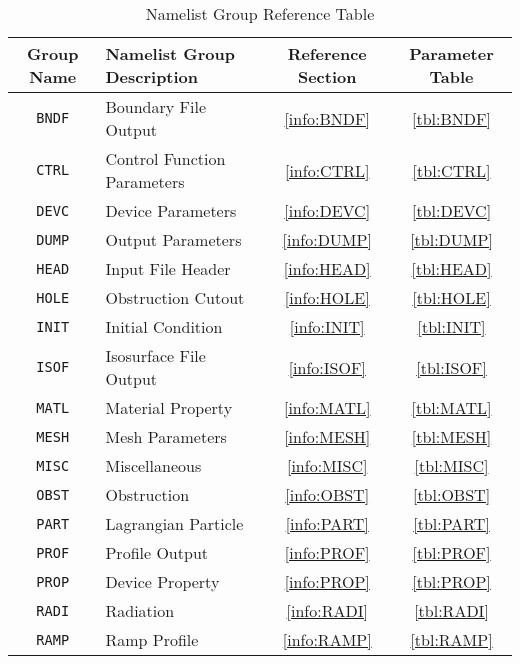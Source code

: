 \documentclass[11pt]{book}
\newcommand{\ct}{\tt\small}
\begin{document}
\vspace{\baselineskip}
\begin{table}[ht]
\begin{center}
\caption{Namelist Group Reference Table}
\label{tbl:namelistgroups}
\begin{tabular}{|c|l|c|c|}
\hline
Group Name  & Namelist Group Description& Reference Section & Parameter Table  \\ \hline
{\ct BNDF}  & Boundary File Output         & \ref{info:BNDF} & \ref{tbl:BNDF}  \\ \hline
{\ct CTRL}  & Control Function Parameters  & \ref{info:CTRL} & \ref{tbl:CTRL}  \\ \hline
{\ct DEVC}  & Device Parameters            & \ref{info:DEVC} & \ref{tbl:DEVC}  \\ \hline
{\ct DUMP}  & Output Parameters            & \ref{info:DUMP} & \ref{tbl:DUMP}  \\ \hline
{\ct HEAD}  & Input File Header            & \ref{info:HEAD} & \ref{tbl:HEAD}  \\ \hline
{\ct HOLE}  & Obstruction Cutout           & \ref{info:HOLE} & \ref{tbl:HOLE}  \\ \hline
{\ct INIT}  & Initial Condition            & \ref{info:INIT} & \ref{tbl:INIT}  \\ \hline
{\ct ISOF}  & Isosurface File Output       & \ref{info:ISOF} & \ref{tbl:ISOF}  \\ \hline
{\ct MATL}  & Material Property            & \ref{info:MATL} & \ref{tbl:MATL}  \\ \hline
{\ct MESH}  & Mesh Parameters              & \ref{info:MESH} & \ref{tbl:MESH}  \\ \hline
{\ct MISC}  & Miscellaneous                & \ref{info:MISC} & \ref{tbl:MISC}  \\ \hline
{\ct OBST}  & Obstruction                  & \ref{info:OBST} & \ref{tbl:OBST}  \\ \hline
{\ct PART}  & Lagrangian Particle          & \ref{info:PART} & \ref{tbl:PART}  \\ \hline
{\ct PROF}  & Profile Output               & \ref{info:PROF} & \ref{tbl:PROF}  \\ \hline
{\ct PROP}  & Device Property              & \ref{info:PROP} & \ref{tbl:PROP}  \\ \hline
{\ct RADI}  & Radiation                    & \ref{info:RADI} & \ref{tbl:RADI}  \\ \hline
{\ct RAMP}  & Ramp Profile                 & \ref{info:RAMP} & \ref{tbl:RAMP}  \\ \hline

\end{tabular}
\end{center}
\end{table}
\end{document}
